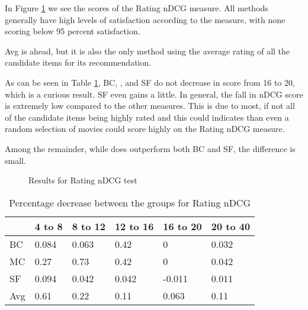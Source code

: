 In Figure \ref{fig:andcg} we see the scores of the Rating nDCG measure. All methods generally have high levels of satisfaction according to the measure, with none scoring below 95 percent satisfaction.

Avg is ahead, but it is also the only method using the average rating of all the candidate items for its recommendation.

As can be seen in Table \ref{tbl:andcg}, BC, \MC, and SF do not decrease in score from 16 to 20, which is a curious result. SF even gains a little. In general, the fall in nDCG score is extremely low compared to the other measures. This is due to most, if not all of the candidate items being highly rated and this could indicates than even a random selection of movies could score highly on the Rating nDCG measure.

Among the remainder, while \MC does outperform both BC and SF, the difference is small.
\begin{figure}[H]
	\caption{Results for Rating nDCG test}\label{fig:andcg}
\end{figure}

\begin{table}[H]
	\centering
	\begin{tabular}{|l|lllll|}\hline
		& 4 to 8 & 8 to 12 & 12 to 16 & 16 to 20 & 20 to 40 \\\hline
		BC 	& 0.084	& 0.063	& 0.42	& 0		& 0.032 \\
		MC  & 0.27	& 0.73	& 0.42	& 0		& 0.042 \\
		SF  & 0.094	& 0.042	& 0.042	&-0.011	& 0.011 \\
		Avg	& 0.61	& 0.22 	& 0.11	& 0.063	& 0.11  \\ \hline
	\end{tabular}
	\caption{Percentage decrease between the groups for Rating nDCG}
	\label{tbl:andcg}
\end{table}